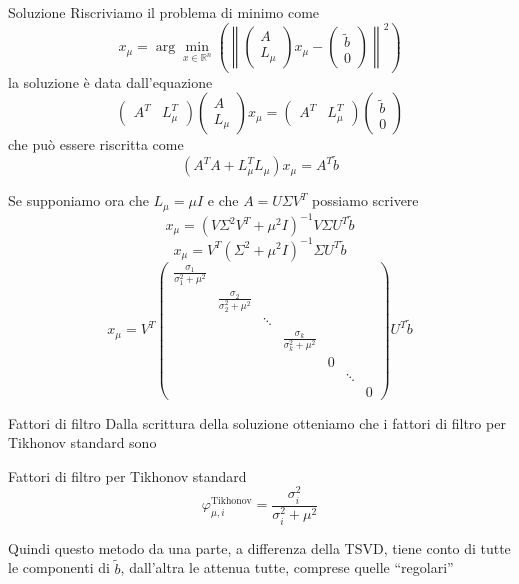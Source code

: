 \documentclass{beamer}
\theoremstyle{plain}
\theoremstyle{definition}
\theoremstyle{remark}
\newcommand{\pa}[1]{\left(#1\right)}
\newcommand{\norm}[1]{\left\|#1\right\|}
\begin{document}
\begin{frame}{Soluzione}
  Riscriviamo il problema di minimo come
  \[ x_\mu = \arg\min _{x \in \mathbb{R}^n} \pa{ \norm{ 
      \begin{pmatrix}
        A \\
        L_\mu
      \end{pmatrix}
      x_\mu -
      \begin{pmatrix}
        \tilde b\\
        0
      \end{pmatrix}
      }^2 }\]
  la soluzione è data dall'equazione
  \[ \begin{pmatrix}
    A^T & L_\mu ^T
  \end{pmatrix}
  \begin{pmatrix}
    A \\
    L_\mu
  \end{pmatrix}
  x_\mu = 
  \begin{pmatrix}
    A^T & L_\mu ^T
  \end{pmatrix}
  \begin{pmatrix}
    \tilde b\\
    0
  \end{pmatrix} \]
  che può essere riscritta come
  \[ \pa{ A^T A + L_\mu^T L_\mu } x_\mu = A^T \tilde b  \]
\end{frame}

\begin{frame}
  Se supponiamo ora che $L_\mu = \mu I$ e che $A = U\Sigma V^T$
  possiamo scrivere
  \[  x_\mu = \pa{ V \Sigma ^2 V^T + \mu ^2 I }^{-1} V \Sigma U^T \tilde b  \]
  \[  x_\mu = V^T \pa{\Sigma ^2 + \mu ^2 I }^{-1} \Sigma U^T \tilde b \]
  \[  x_\mu = V^T
  \begin{pmatrix}
    \frac{\sigma _1 }{\sigma _1 ^2 + \mu ^2} \\
    & \frac{\sigma _2 }{\sigma _2 ^2 + \mu ^2} \\
    & & \ddots \\
    & & & \frac{\sigma _k }{\sigma _k ^2 + \mu ^2}\\
    & & & & 0\\
    & & & & & \ddots \\
    & & & & & & 0
  \end{pmatrix}
  U^T \tilde  b \]
\end{frame}

\begin{frame}{Fattori di filtro}
  Dalla scrittura della soluzione otteniamo che i fattori di filtro
  per Tikhonov standard sono
  \begin{block}{Fattori di filtro per Tikhonov standard}
  \[ \varphi ^{\text{Tikhonov}} _{\mu,i} = \frac{\sigma _i ^2}{\sigma _i
    ^2 + \mu ^2} \]
  \end{block}
  \vfill
  
  Quindi questo metodo da una parte, a differenza della TSVD, tiene
  conto di tutte le componenti di $\tilde b$, dall'altra le attenua
  tutte, comprese quelle ``regolari''
\end{frame}
\end{document}
